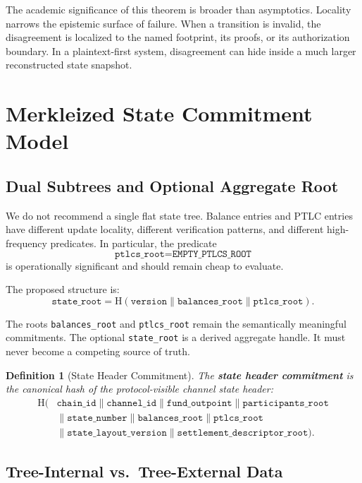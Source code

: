 \documentclass[11pt,a4paper]{article}
\newtheorem{definition}[theorem]{Definition}
\newcommand{\code}[1]{\texttt{#1}}
\newcommand{\Hash}{\mathrm{H}}
\begin{document}
The academic significance of this theorem is broader than asymptotics. Locality narrows the epistemic surface of failure. When a transition is invalid, the disagreement is localized to the named footprint, its proofs, or its authorization boundary. In a plaintext-first system, disagreement can hide inside a much larger reconstructed state snapshot.

\section{Merkleized State Commitment Model}

\subsection{Dual Subtrees and Optional Aggregate Root}

We do not recommend a single flat state tree. Balance entries and PTLC entries have different update locality, different verification patterns, and different high-frequency predicates. In particular, the predicate
\[
\texttt{ptlcs\_root} = \texttt{EMPTY\_PTLCS\_ROOT}
\]
is operationally significant and should remain cheap to evaluate.

The proposed structure is:
\[
\texttt{state\_root} = \Hash(\texttt{version} \parallel \texttt{balances\_root} \parallel \texttt{ptlcs\_root}).
\]

The roots \code{balances\_root} and \code{ptlcs\_root} remain the semantically meaningful commitments. The optional \code{state\_root} is a derived aggregate handle. It must never become a competing source of truth.

\begin{definition}[State Header Commitment]
The \textbf{state header commitment} is the canonical hash of the protocol-visible channel state header:
\begin{align*}
\Hash(&\texttt{chain\_id} \parallel \texttt{channel\_id} \parallel \texttt{fund\_outpoint} \parallel \texttt{participants\_root} \\
      &\parallel \texttt{state\_number} \parallel \texttt{balances\_root} \parallel \texttt{ptlcs\_root} \\
      &\parallel \texttt{state\_layout\_version} \parallel \texttt{settlement\_descriptor\_root}).
\end{align*}
\end{definition}

\subsection{Tree-Internal vs.\ Tree-External Data}
\end{document}
